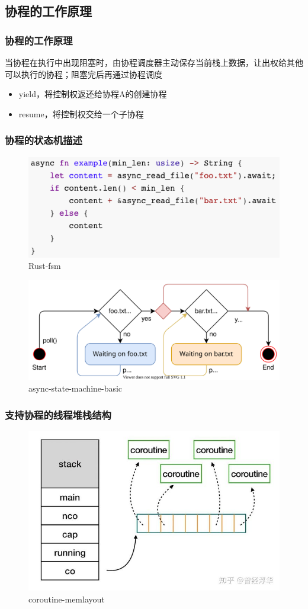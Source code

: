 \subsection{协程的工作原理}
% 
\begin{frame}[fragile]
    \frametitle{协程的工作原理}
% 
当协程在执行中出现阻塞时，由协程调度器主动保存当前栈上数据，让出权给其他可以执行的协程；阻塞完后再通过协程调度%

    \begin{itemize}
        \item yield，将控制权返还给协程A的创建协程
        \item resume，将控制权交给一个子协程
    \end{itemize}

% 

\end{frame}
\begin{frame}[fragile]
    \frametitle{协程的状态机\href{https://os.phil-opp.com/async-await/#the-async-await-pattern}{描述}}
% 
	\begin{figure}
		\centering
		\includegraphics[width=0.2\linewidth]{figs/Rust-fsm.png}
		\caption{Rust-fsm}
	\end{figure}


% 
	\begin{figure}
		\centering
		\includegraphics[width=0.2\linewidth]{figs/async-state-machine-basic.svg}
    \caption{async-state-machine-basic}
  \end{figure}


% 
% 
% 

\end{frame}
\begin{frame}[fragile]
    \frametitle{支持协程的线程堆栈结构}
% 
	\begin{figure}
		\centering
		\includegraphics[width=0.5\linewidth]{figs/coroutine-memlayout.jpg}
    \caption{coroutine-memlayout}
  \end{figure}



% 

\end{frame}
